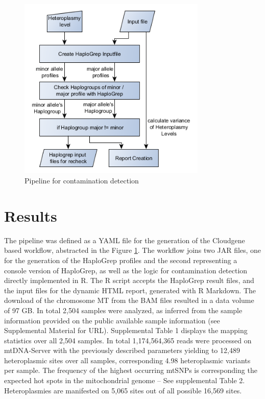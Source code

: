 \begin{figure}[!ht]
    \centering
    \includegraphics[width=0.8\textwidth]{images/dataflow.png}
    \caption[Pipeline for contamination detection]{Pipeline for contamination detection } 
    \label{cont:workflow}
\end{figure}

 
\section{Results}\label{cont:result}
The pipeline was defined as a YAML file for the generation of the Cloudgene based workflow, abstracted in the Figure \ref{cont:workflow}. The workflow joins two JAR files, one for the generation of the HaploGrep profiles and the second representing a console version of HaploGrep, as well as the logic for contamination detection directly implemented in R. The R script accepts the HaploGrep result files, and the input files for the dynamic HTML report, generated with R Markdown. 
The download of the chromosome MT from the BAM files resulted in a data volume of 97 GB. In total 2,504 samples were analyzed, as inferred from the sample information provided on the public available sample information (see Supplemental Material for URL). Supplemental Table 1 displays the mapping statistics over all 2,504 samples. In total 1,174,564,365 reads were processed on mtDNA-Server with the previously described parameters yielding to 12,489 heteroplasmic sites over all samples, corresponding 4.98 heteroplasmic variants per sample. The frequency of the highest occurring mtSNPs is corresponding the expected hot spots in the mitochondrial genome – See supplemental Table 2. Heteroplasmies are manifested on 5,065 sites out of all possible 16,569 sites. 

